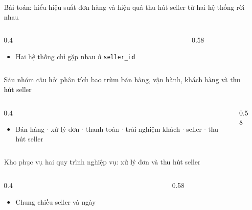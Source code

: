 \begin{frame}{Bài toán: hiểu hiệu suất đơn hàng và hiệu quả thu hút seller từ hai hệ thống rời nhau}
\begin{columns}[T]\begin{column}{0.4\textwidth}
\begin{itemize}
  \item Hai hệ thống chỉ gặp nhau ở \texttt{seller\_\allowbreak{}id}
\end{itemize}
\end{column}\begin{column}{0.58\textwidth}
\begin{center}\end{center}
\end{column}\end{columns}

\end{frame}

\begin{frame}{Sáu nhóm câu hỏi phân tích bao trùm bán hàng, vận hành, khách hàng và thu hút seller}
\begin{columns}[T]\begin{column}{0.4\textwidth}
\begin{itemize}
  \item Bán hàng $\cdot$ xử lý đơn $\cdot$ thanh toán $\cdot$ trải nghiệm khách $\cdot$ seller $\cdot$ thu hút seller
\end{itemize}
\end{column}\begin{column}{0.58\textwidth}
\begin{center}\end{center}
\end{column}\end{columns}

\end{frame}

\begin{frame}{Kho phục vụ hai quy trình nghiệp vụ: xử lý đơn và thu hút seller}
\begin{columns}[T]\begin{column}{0.4\textwidth}
\begin{itemize}
  \item Chung chiều seller và ngày
\end{itemize}
\end{column}\begin{column}{0.58\textwidth}
\begin{center}\end{center}
\end{column}\end{columns}

\end{frame}

